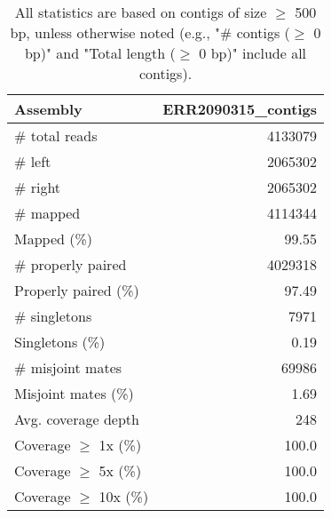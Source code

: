 \documentclass[12pt,a4paper]{article}
\begin{document}
\begin{table}[ht]
\begin{center}
\caption{All statistics are based on contigs of size $\geq$ 500 bp, unless otherwise noted (e.g., "\# contigs ($\geq$ 0 bp)" and "Total length ($\geq$ 0 bp)" include all contigs).}
\begin{tabular}{|l*{1}{|r}|}
\hline
Assembly & ERR2090315\_contigs \\ \hline
\# total reads & 4133079 \\ \hline
\# left & 2065302 \\ \hline
\# right & 2065302 \\ \hline
\# mapped & 4114344 \\ \hline
Mapped (\%) & 99.55 \\ \hline
\# properly paired & 4029318 \\ \hline
Properly paired (\%) & 97.49 \\ \hline
\# singletons & 7971 \\ \hline
Singletons (\%) & 0.19 \\ \hline
\# misjoint mates & 69986 \\ \hline
Misjoint mates (\%) & 1.69 \\ \hline
Avg. coverage depth & 248 \\ \hline
Coverage $\geq$ 1x (\%) & 100.0 \\ \hline
Coverage $\geq$ 5x (\%) & 100.0 \\ \hline
Coverage $\geq$ 10x (\%) & 100.0 \\ \hline
\end{tabular}
\end{center}
\end{table}
\end{document}
